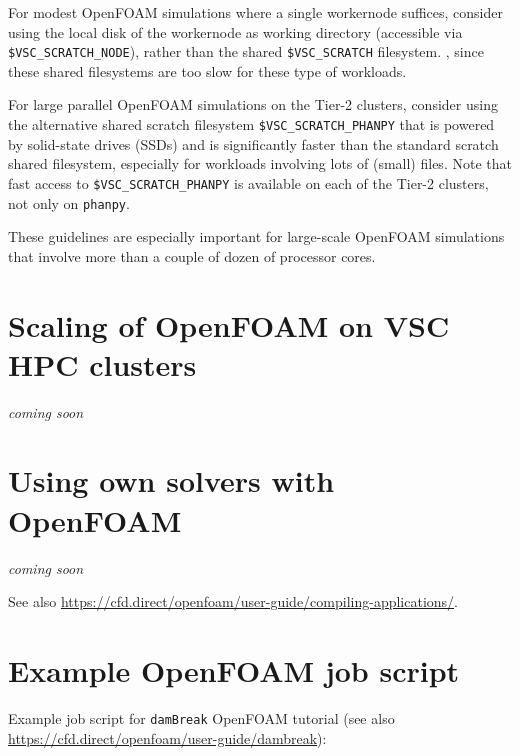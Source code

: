 For modest OpenFOAM simulations where a single workernode suffices, consider using the local disk of the
workernode as working directory (accessible via \lstinline|$VSC_SCRATCH_NODE|),
rather than the shared \lstinline|$VSC_SCRATCH| filesystem. , since these shared filesystems are too slow for these type of workloads.

\ifgent
For large parallel OpenFOAM simulations on the \university Tier-2 clusters, consider using the
alternative shared scratch filesystem \lstinline|$VSC_SCRATCH_PHANPY| that is powered by
solid-state drives (SSDs) and is significantly faster than the standard scratch
shared filesystem, especially for workloads involving lots of (small) files. Note that fast access to
\lstinline|$VSC_SCRATCH_PHANPY| is available on each of the \university Tier-2 clusters, not only on \lstinline|phanpy|.
\fi

These guidelines are especially important for large-scale OpenFOAM simulations that involve
more than a couple of dozen of processor cores.

\section{Scaling of OpenFOAM on VSC HPC clusters}
\label{sec:best-practices-openfoam-scaling}

\emph{coming soon}

\section{Using own solvers with OpenFOAM}
\label{sec:best-practices-openfoam-own-solvers-libraries}

\emph{coming soon}

See also {\small\url{https://cfd.direct/openfoam/user-guide/compiling-applications/}}.

\section{Example OpenFOAM job script}
\label{sec:best-practices-openfoam-example-script}

Example job script for \lstinline|damBreak| OpenFOAM tutorial
(see also \url{https://cfd.direct/openfoam/user-guide/dambreak}):

